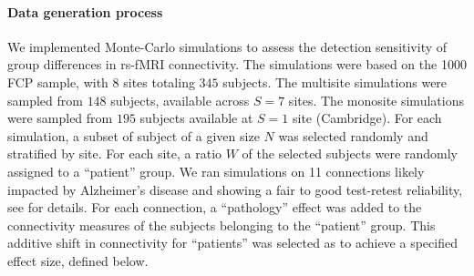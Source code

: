\documentclass[authoryear]{elsarticle}
\begin{document}
\paragraph{Data generation process}
We implemented Monte-Carlo simulations to assess the detection sensitivity of group differences in rs-fMRI connectivity. The simulations were based on the 1000 FCP sample, with 8 sites totaling $345$ subjects. The multisite simulations were sampled from $148$ subjects, available across $S=7$ sites. The monosite simulations were sampled from $195$ subjects available at $S=1$ site (Cambridge). For each simulation, a subset of subject of a given size $N$ was selected randomly and stratified by site. For each site, a ratio $W$ of the selected subjects were randomly assigned to a ``patient'' group. We ran simulations on 11 connections likely impacted by Alzheimer's disease and showing a fair to good test-retest reliability, see \cite{Orban2015} for details. For each connection, a ``pathology'' effect was added to the connectivity measures of the subjects belonging to the ``patient'' group. This additive shift in connectivity for ``patients'' was selected as to achieve a specified effect size, defined below. 

% 
% 

\end{document}
